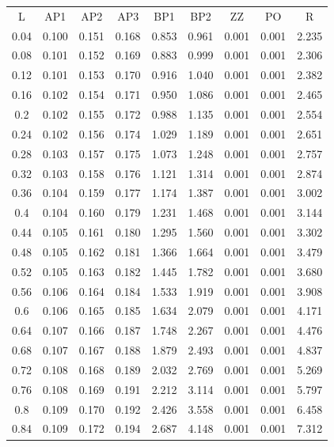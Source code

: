 \documentclass[11pt]{article}
\begin{document}
\begin{table}[h!]
  \begin{center}
    \begin{tabular}{| c c c c c c c c c |}
    \hline
L & AP1 & AP2 & AP3 & BP1 & BP2 & ZZ & PO & R \\
0.04 & 0.100 & 0.151 & 0.168 & 0.853 & 0.961 & 0.001 & 0.001 & 2.235\\
0.08 & 0.101 & 0.152 & 0.169 & 0.883 & 0.999 & 0.001 & 0.001 & 2.306\\
0.12 & 0.101 & 0.153 & 0.170 & 0.916 & 1.040 & 0.001 & 0.001 & 2.382\\
0.16 & 0.102 & 0.154 & 0.171 & 0.950 & 1.086 & 0.001 & 0.001 & 2.465\\
0.2 & 0.102 & 0.155 & 0.172 & 0.988 & 1.135 & 0.001 & 0.001 & 2.554\\
0.24 & 0.102 & 0.156 & 0.174 & 1.029 & 1.189 & 0.001 & 0.001 & 2.651\\
0.28 & 0.103 & 0.157 & 0.175 & 1.073 & 1.248 & 0.001 & 0.001 & 2.757\\
0.32 & 0.103 & 0.158 & 0.176 & 1.121 & 1.314 & 0.001 & 0.001 & 2.874\\
0.36 & 0.104 & 0.159 & 0.177 & 1.174 & 1.387 & 0.001 & 0.001 & 3.002\\
0.4 & 0.104 & 0.160 & 0.179 & 1.231 & 1.468 & 0.001 & 0.001 & 3.144\\
0.44 & 0.105 & 0.161 & 0.180 & 1.295 & 1.560 & 0.001 & 0.001 & 3.302\\
0.48 & 0.105 & 0.162 & 0.181 & 1.366 & 1.664 & 0.001 & 0.001 & 3.479\\
0.52 & 0.105 & 0.163 & 0.182 & 1.445 & 1.782 & 0.001 & 0.001 & 3.680\\
0.56 & 0.106 & 0.164 & 0.184 & 1.533 & 1.919 & 0.001 & 0.001 & 3.908\\
0.6 & 0.106 & 0.165 & 0.185 & 1.634 & 2.079 & 0.001 & 0.001 & 4.171\\
0.64 & 0.107 & 0.166 & 0.187 & 1.748 & 2.267 & 0.001 & 0.001 & 4.476\\
0.68 & 0.107 & 0.167 & 0.188 & 1.879 & 2.493 & 0.001 & 0.001 & 4.837\\
0.72 & 0.108 & 0.168 & 0.189 & 2.032 & 2.769 & 0.001 & 0.001 & 5.269\\
0.76 & 0.108 & 0.169 & 0.191 & 2.212 & 3.114 & 0.001 & 0.001 & 5.797\\
0.8 & 0.109 & 0.170 & 0.192 & 2.426 & 3.558 & 0.001 & 0.001 & 6.458\\
0.84 & 0.109 & 0.172 & 0.194 & 2.687 & 4.148 & 0.001 & 0.001 & 7.312\\

\end{tabular}
\end{center}
\end{table}
\end{document}

